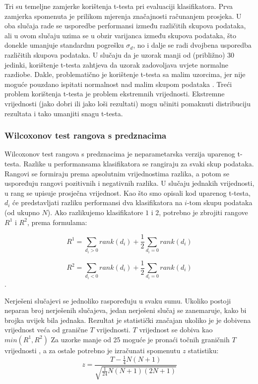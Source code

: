 Tri su temeljne zamjerke korištenja t-testa pri evaluaciji klasifikatora. Prva zamjerka spomenuta je prilikom mjerenja značajnosti računanjem prosjeka. U oba slučaja rade se usporedbe performansi između različitih skupova podataka, ali u ovom slučaju uzima se u obzir varijanca između skupova podataka, što donekle umanjuje standardnu pogrešku $\sigma_d$, no i dalje se radi dvojbena usporedba različitih skupova podataka. U slučaju da je uzorak manji od (približno) 30 jedinki, korištenje t-testa zahtjeva da uzorak zadovoljava uvjete normalne razdiobe. Dakle, problematično je korištenje t-testa sa malim uzorcima, jer nije moguće pouzdano ispitati normalnost nad malim skupom podataka \citep{razali2011power}. Treći problem korištenja t-testa je problem ekstremnih vrijednosti. Ekstremne vrijednosti (jako dobri ili jako loši rezultati) mogu učiniti pomaknuti distribuciju rezultata i tako umanjiti snagu t-testa.

\subsubsection{Wilcoxonov test rangova s predznacima}

Wilcoxonov test rangova s predznacima \citep{wilcoxon1945individual} je neparametarska verzija uparenog t-testa. Razlike u performansama klasifikatora se rangiraju za svaki skup podataka. Rangovi se formiraju prema apsolutnim vrijednostima razlika, a potom se uspoređuju rangovi pozitivnih i negativnih razlika. U slučaju jednakih vrijednosti, u rang se upisuje prosječna vrijednost. Kao što smo opisali kod uparenog t-testa, $d_i$ će predstavljati razliku performansi dva klasifikatora na $i$-tom skupu podataka (od ukupno $N$). Ako razlikujemo klasifikatore $1$ i $2$, potrebno je zbrojiti rangove $R^1$ i $R^2$, prema formulama:

$$ R^1 = \sum_{d_i>0} rank(d_i) + \frac{1}{2} \sum_{d_i=0} rank(d_i) $$

$$ R^2 = \sum_{d_i<0} rank(d_i) + \frac{1}{2} \sum_{d_i=0} rank(d_i) $$.

Nerješeni slučajevi se jednoliko raspoređuju u svaku sumu. Ukoliko postoji neparan broj nerješenih slučajeva, jedan nerješeni slučaj se zanemaruje, kako bi brojka uvijek bila jednaka. Rezultat je statistički značajan ukoliko je je dobivena vrijednost veća od granične $T$ vrijednosti. $T$ vrijednost se dobiva kao $min(R^1, R^2)$ 
Za uzorke manje od 25 moguće je pronaći točnih graničnih $T$ vrijednosti \citep{wilcoxon1973critical}, a za ostale potrebno je izračunati spomenutu $z$ statistiku:
$$z = \frac{T - \frac{1}{4}N(N+1)}{\sqrt{\frac{1}{24}N(N+1)(2N+1)}}$$

